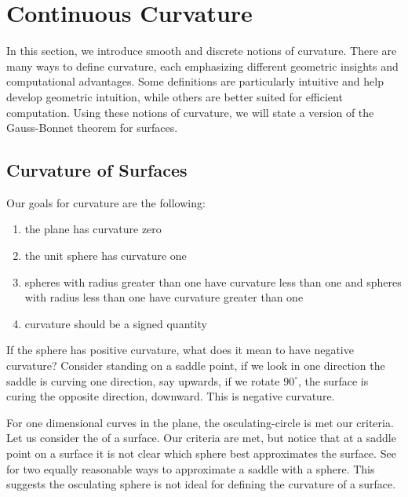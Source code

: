 \section{Continuous Curvature}
\label{sec:curvature}

In this section, we introduce smooth and discrete notions of curvature. 
There are many ways to define curvature, each emphasizing different geometric insights and computational advantages. 
Some definitions are particularly intuitive and help develop geometric intuition, while others are better suited for efficient computation. 
Using these notions of curvature, we will state a version of the Gauss-Bonnet theorem for surfaces.



\subsection{Curvature of Surfaces}

Our goals for curvature are the following:
\begin{enumerate}
\item the plane has curvature zero
\item the unit sphere has curvature one
\item spheres with radius greater than one have curvature less than one and
spheres with radius less than one have curvature greater than one
\item curvature should be a signed quantity
\end{enumerate}

If the sphere has positive curvature, what does it mean to have negative curvature?
Consider standing on a saddle point, if we look in one direction the saddle is curving
one direction, say upwards, if we rotate $90^\circ$, the surface is curing the opposite direction, downward.  This is negative curvature.


For one dimensional curves in the plane, the osculating-circle is
met our criteria.
 Let us consider the  of a surface.
 Our criteria are met,
 but notice that at a saddle point on a surface it is not clear which sphere
best approximates the surface. See  for two
equally reasonable ways to approximate a saddle with a sphere.
This suggests the osculating sphere is not ideal for defining the curvature
of a surface.

